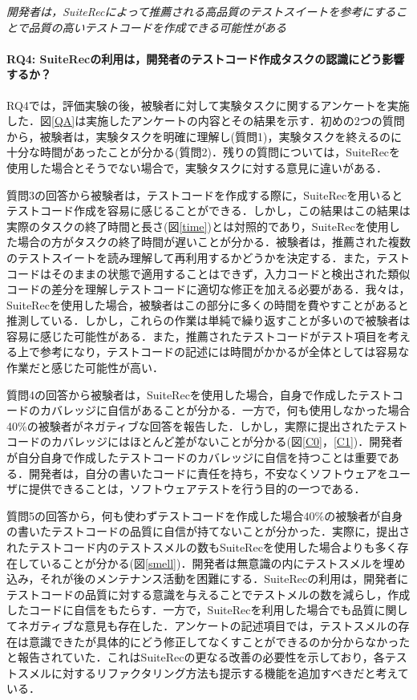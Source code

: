 \documentclass[12pt]{jarticle} %
\begin{document}
\begin{breakbox}
\textit{開発者は，{\sf SuiteRec}によって推薦される高品質のテストスイートを参考にすることで品質の高いテストコードを作成できる可能性がある}
\end{breakbox}

\paragraph{RQ4: {\sf SuiteRec}の利用は，開発者のテストコード作成タスクの認識にどう影響するか？}

RQ4では，評価実験の後，被験者に対して実験タスクに関するアンケートを実施した．図\ref{QA}は実施したアンケートの内容とその結果を示す．初めの2つの質問から，被験者は，実験タスクを明確に理解し(質問1)，実験タスクを終えるのに十分な時間があったことが分かる(質問2)．残りの質問については，{\sf SuiteRec}を使用した場合とそうでない場合で，実験タスクに対する意見に違いがある．

質問3の回答から被験者は，テストコードを作成する際に，{\sf SuiteRec}を用いるとテストコード作成を容易に感じることができる．しかし，この結果はこの結果は実際のタスクの終了時間と長さ(図\ref{time})とは対照的であり，{\sf SuiteRec}を使用した場合の方がタスクの終了時間が遅いことが分かる．被験者は，推薦された複数のテストスイートを読み理解して再利用するかどうかを決定する．また，テストコードはそのままの状態で適用することはできず，入力コードと検出された類似コードの差分を理解しテストコードに適切な修正を加える必要がある．我々は，{\sf SuiteRec}を使用した場合，被験者はこの部分に多くの時間を費やすことがあると推測している．しかし，これらの作業は単純で繰り返すことが多いので被験者は容易に感じた可能性がある．また，推薦されたテストコードがテスト項目を考える上で参考になり，テストコードの記述には時間がかかるが全体としては容易な作業だと感じた可能性が高い．

質問4の回答から被験者は，{\sf SuiteRec}を使用した場合，自身で作成したテストコードのカバレッジに自信があることが分かる．一方で，何も使用しなかった場合40\%の被験者がネガティブな回答を報告した．しかし，実際に提出されたテストコードのカバレッジにはほとんど差がないことが分かる(図\ref{C0}，\ref{C1})．開発者が自分自身で作成したテストコードのカバレッジに自信を持つことは重要である．開発者は，自分の書いたコードに責任を持ち，不安なくソフトウェアをユーザに提供できることは，ソフトウェアテストを行う目的の一つである．

質問5の回答から，何も使わずテストコードを作成した場合40\%の被験者が自身の書いたテストコードの品質に自信が持てないことが分かった．実際に，提出されたテストコード内のテストスメルの数も{\sf SuiteRec}を使用した場合よりも多く存在していることが分かる(図\ref{smell})．開発者は無意識の内にテストスメルを埋め込み，それが後のメンテナンス活動を困難にする．{\sf SuiteRec}の利用は，開発者にテストコードの品質に対する意識を与えることでテストメルの数を減らし，作成したコードに自信をもたらす．一方で，{\sf SuiteRec}を利用した場合でも品質に関してネガティブな意見も存在した．アンケートの記述項目では，テストスメルの存在は意識できたが具体的にどう修正してなくすことができるのか分からなかったと報告されていた．これは{\sf SuiteRec}の更なる改善の必要性を示しており，各テストスメルに対するリファクタリング方法も提示する機能を追加すべきだと考えている．
\end{document}
